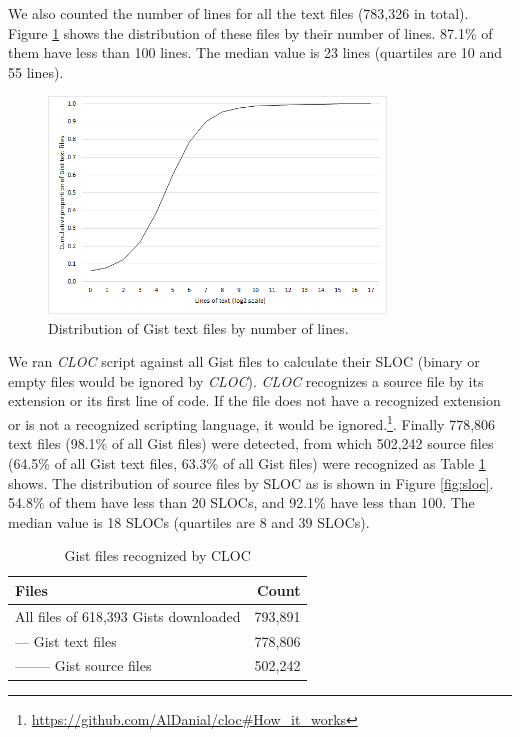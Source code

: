 We also counted the number of lines for all the text files (783,326 in total). Figure \ref{fig:textlines} shows the distribution of these files by their number of lines. 87.1\% of them have less than 100 lines. The median value is 23 lines (quartiles are 10 and 55 lines).

\begin{figure}[!htb]
	\centering
	\includegraphics[width=0.8\textwidth]{figures/text_files_lines.png}
	\caption{Distribution of Gist text files by number of lines.}
	\label{fig:textlines}
\end{figure}

We ran \textit{CLOC} script against all Gist files to calculate their SLOC (binary or empty files would be ignored by \textit{CLOC}). \textit{CLOC} recognizes a source file by its extension or its first line of code. If the file does not have a recognized extension or is not a recognized scripting language, it would be ignored.\footnote{\url{https://github.com/AlDanial/cloc\#How_it_works}}. Finally 778,806 text files (98.1\% of all Gist files) were detected, from which 502,242 source files (64.5\% of all Gist text files, 63.3\% of all Gist files) were recognized as Table \ref{tb:clocfiles} shows. The distribution of source files by SLOC as is shown in Figure \ref{fig:sloc}. 54.8\% of them have less than 20 SLOCs, and 92.1\% have less than 100. The median value is 18 SLOCs (quartiles are 8 and 39 SLOCs).

\begin{table}[!htb]
 \begin{center}
 \begin{tabular}{@{}lr} 
    \textbf{Files}	&	\textbf{Count} \\ \hline
	All files of 618,393 Gists downloaded &	793,891\\
	--- Gist text files	&	778,806\\
	-------- Gist source files &	502,242\\ \hline
 \end{tabular}
 \end{center}
 \caption{Gist files recognized by CLOC}
 \label{tb:clocfiles}
\end{table}

